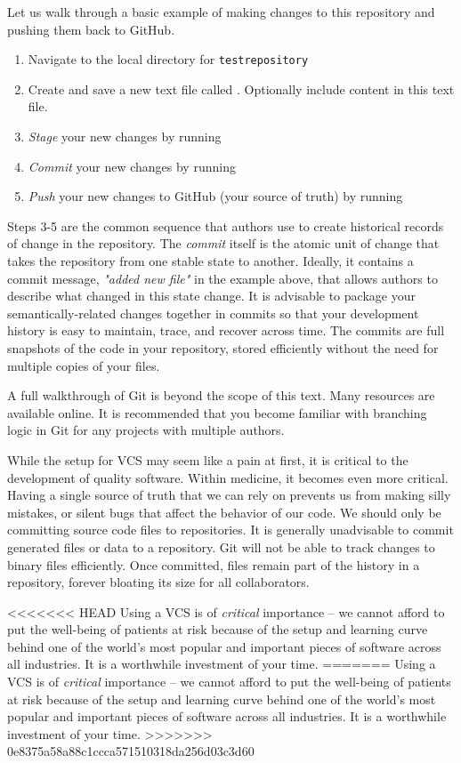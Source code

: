 Let us walk through a basic example of making changes to this repository and pushing them back to GitHub.

\begin{enumerate}
    \item Navigate to the local directory for \texttt{test\textunderscore repository}
    \item Create and save a new text file called . Optionally include content in this text file.
    \item \textit{Stage} your new changes by running 
    \item \textit{Commit} your new changes by running 
    \item \textit{Push} your new changes to GitHub (your source of truth) by running 
\end{enumerate}

Steps 3-5 are the common sequence that authors use to create historical records of change in the repository. The \textit{commit} itself is the atomic unit of change that takes the repository from one stable state to another. Ideally, it contains a commit message, \textit{"added new file"} in the example above, that allows authors to describe what changed in this state change.
It is advisable to package your semantically-related changes together in commits so that your development history is easy to maintain, trace, and recover across time. The commits are full snapshots of the code in your repository, stored efficiently without the need for multiple copies of your files.

A full walkthrough of Git is beyond the scope of this text. Many resources are available online. It is recommended that you become familiar with branching logic in Git for any projects with multiple authors.

While the setup for VCS may seem like a pain at first, it is critical to the development of quality software.
Within medicine, it becomes even more critical. Having a single source of truth that we can rely on prevents us from making silly mistakes, or silent bugs that affect the behavior of our code. We should only be committing source code files to repositories. It is generally unadvisable to commit generated files or data to a repository. Git will not be able to track changes to binary files efficiently. Once committed, files remain part of the history in a repository, forever bloating its size for all collaborators.

<<<<<<< HEAD
Using a VCS is of \textit{critical} importance -- we cannot afford to put the well-being of patients at risk because of the setup and learning curve behind one of the world's most popular and important pieces of software across all industries. It is a worthwhile investment of your time.
=======
Using a VCS is of \textit{critical} importance -- we cannot afford to put the well-being of patients at risk because of the setup and learning curve behind one of the world's most popular and important pieces of software across all industries. It is a worthwhile investment of your time.
>>>>>>> 0e8375a58a88c1ccca571510318da256d03c3d60

